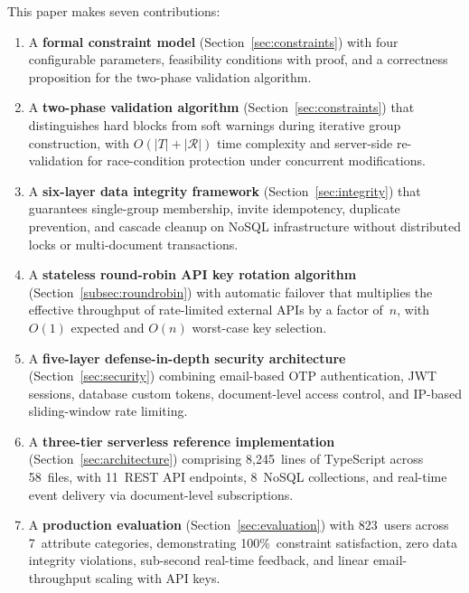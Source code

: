 \documentclass[11pt,a4paper]{article}
\theoremstyle{plain}
\theoremstyle{definition}
\begin{document}
This paper makes seven contributions:

\begin{enumerate}[noitemsep,topsep=4pt]
    \item A \textbf{formal constraint model} (Section~\ref{sec:constraints}) with four configurable parameters, feasibility conditions with proof, and a correctness proposition for the two-phase validation algorithm.

    \item A \textbf{two-phase validation algorithm} (Section~\ref{sec:constraints}) that distinguishes hard blocks from soft warnings during iterative group construction, with $O(|T| + |\mathcal{R}|)$ time complexity and server-side re-validation for race-condition protection under concurrent modifications.

    \item A \textbf{six-layer data integrity framework} (Section~\ref{sec:integrity}) that guarantees single-group membership, invite idempotency, duplicate prevention, and cascade cleanup on NoSQL infrastructure without distributed locks or multi-document transactions.

    \item A \textbf{stateless round-robin API key rotation algorithm} (Section~\ref{subsec:roundrobin}) with automatic failover that multiplies the effective throughput of rate-limited external APIs by a factor of~$n$, with $O(1)$ expected and $O(n)$ worst-case key selection.

    \item A \textbf{five-layer defense-in-depth security architecture} (Section~\ref{sec:security}) combining email-based OTP authentication, JWT sessions, database custom tokens, document-level access control, and IP-based sliding-window rate limiting.

    \item A \textbf{three-tier serverless reference implementation} (Section~\ref{sec:architecture}) comprising 8,245~lines of TypeScript across 58~files, with 11~REST API endpoints, 8~NoSQL collections, and real-time event delivery via document-level subscriptions.

    \item A \textbf{production evaluation} (Section~\ref{sec:evaluation}) with 823~users across 7~attribute categories, demonstrating 100\%~constraint satisfaction, zero data integrity violations, sub-second real-time feedback, and linear email-throughput scaling with API keys.
\end{enumerate}
\end{document}
